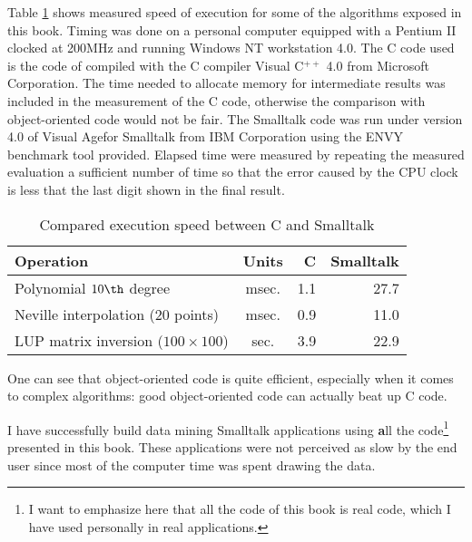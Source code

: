 Table \ref{tb:speed} shows measured speed of execution for some of
the algorithms exposed in this book. Timing was done on a personal
computer equipped with a Pentium II clocked at 200MHz and running
Windows NT workstation 4.0. The C code used is the code of
\cite{Press} compiled with the C compiler Visual C$^{++}$ 4.0 from
Microsoft Corporation. The time needed to allocate memory for
intermediate results was included in the measurement of the C
code, otherwise the comparison with object-oriented code would not
be fair. The Smalltalk code was run under version 4.0 of Visual
Age\tm for Smalltalk from IBM Corporation using the ENVY benchmark
tool provided.
Elapsed time were measured
by repeating the measured evaluation a sufficient number of time
so that the error caused by the CPU clock is less that the last
digit shown in the final result.
\begin{table}[h]
\caption{Compared execution speed between C and Smalltalk}
\label{tb:speed} \vspace{1 ex}
\begin{tabular}{|l | c r r |} \hline
  \hfil \textbf{Operation} & \textbf{Units} & \textbf{C}\hfil & \textbf{Smalltalk}\hfil \\ \hline
  Polynomial $10\th$ degree & msec. & 1.1 & 27.7 \\
  Neville interpolation (20 points) & msec. & 0.9 & 11.0 \\
  LUP matrix inversion ($100\times 100$)& sec. & 3.9 & 22.9 \\ \hline
\end{tabular}
\end{table}

One can see that object-oriented code is quite efficient,
especially when it comes to complex algorithms: good
object-oriented code can actually beat up C code.


I have successfully build data mining Smalltalk
applications using {\textbf all the code}\footnote{I want to emphasize
here that all the code of this book is real code, which I have
used personally in real applications.} presented in this book.
These applications were not perceived as slow by the end user
since most of the computer time was spent drawing the data.

